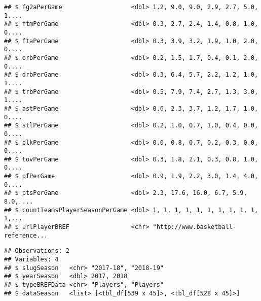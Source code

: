 \documentclass[]{article}
\newenvironment{Shaded}{\begin{snugshade}}{\end{snugshade}}
\newcommand{\KeywordTok}[1]{\textcolor[rgb]{0.13,0.29,0.53}{\textbf{#1}}}
\newcommand{\DataTypeTok}[1]{\textcolor[rgb]{0.13,0.29,0.53}{#1}}
\newcommand{\StringTok}[1]{\textcolor[rgb]{0.31,0.60,0.02}{#1}}
\newcommand{\CommentTok}[1]{\textcolor[rgb]{0.56,0.35,0.01}{\textit{#1}}}
\newcommand{\OtherTok}[1]{\textcolor[rgb]{0.56,0.35,0.01}{#1}}
\newcommand{\ControlFlowTok}[1]{\textcolor[rgb]{0.13,0.29,0.53}{\textbf{#1}}}
\newcommand{\OperatorTok}[1]{\textcolor[rgb]{0.81,0.36,0.00}{\textbf{#1}}}
\newcommand{\NormalTok}[1]{#1}
\begin{document}
\begin{verbatim}
## $ fg2aPerGame                   <dbl> 1.2, 9.0, 9.0, 2.9, 2.7, 5.0, 1....
## $ ftmPerGame                    <dbl> 0.3, 2.7, 2.4, 1.4, 0.8, 1.0, 0....
## $ ftaPerGame                    <dbl> 0.3, 3.9, 3.2, 1.9, 1.0, 2.0, 0....
## $ orbPerGame                    <dbl> 0.2, 1.5, 1.7, 0.4, 0.1, 2.0, 0....
## $ drbPerGame                    <dbl> 0.3, 6.4, 5.7, 2.2, 1.2, 1.0, 1....
## $ trbPerGame                    <dbl> 0.5, 7.9, 7.4, 2.7, 1.3, 3.0, 1....
## $ astPerGame                    <dbl> 0.6, 2.3, 3.7, 1.2, 1.7, 1.0, 0....
## $ stlPerGame                    <dbl> 0.2, 1.0, 0.7, 1.0, 0.4, 0.0, 0....
## $ blkPerGame                    <dbl> 0.0, 0.8, 0.7, 0.2, 0.3, 0.0, 0....
## $ tovPerGame                    <dbl> 0.3, 1.8, 2.1, 0.3, 0.8, 1.0, 0....
## $ pfPerGame                     <dbl> 0.9, 1.9, 2.2, 3.0, 1.4, 4.0, 0....
## $ ptsPerGame                    <dbl> 2.3, 17.6, 16.0, 6.7, 5.9, 8.0, ...
## $ countTeamsPlayerSeasonPerGame <dbl> 1, 1, 1, 1, 1, 1, 1, 1, 1, 1, 1,...
## $ urlPlayerBREF                 <chr> "http://www.basketball-reference...
\end{verbatim}

\begin{Shaded}
\end{Shaded}

\begin{verbatim}
## Observations: 2
## Variables: 4
## $ slugSeason   <chr> "2017-18", "2018-19"
## $ yearSeason   <dbl> 2017, 2018
## $ typeBREFData <chr> "Players", "Players"
## $ dataSeason   <list> [<tbl_df[539 x 45]>, <tbl_df[528 x 45]>]
\end{verbatim}
\end{document}
